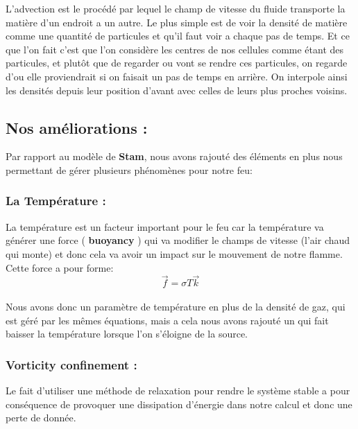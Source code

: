 \documentclass[a4paper,10pt]{article}
\begin{document}
\begin{enumerate}
  L'advection est le procédé par lequel le
    champ de vitesse du fluide transporte la matière d'un endroit a un
    autre. Le plus simple est de voir la densité de matière comme une
    quantité de particules et qu'il faut voir a chaque pas de
    temps. Et ce que l'on fait c'est que l'on considère les centres de
    nos cellules comme étant des particules, et plutôt que de regarder
    ou vont se rendre ces particules, on regarde d'ou elle
    proviendrait si on faisait un pas de temps en arrière. On
    interpole ainsi les densités depuis leur position d'avant avec
    celles de leurs plus proches voisins.\\
\end{enumerate}

\subsection{Nos améliorations :}
Par rapport au modèle de \textbf{Stam}, nous avons rajouté des éléments en plus 
nous permettant de gérer plusieurs phénomènes pour notre feu:\\
 
\subsubsection{La Température :}
La température est un facteur important pour le feu car la température
va générer une force ( \textbf{buoyancy} ) qui va modifier le champs de vitesse 
(l'air chaud qui monte) et donc cela va avoir un impact sur le mouvement de notre
flamme.\\ 
Cette force a pour forme:\\
\begin{equation}
	\vec{f} = \sigma T \vec{k} 
\end{equation}
\\

Nous avons donc un paramètre de température en plus de la densité de gaz, qui
est géré par les mêmes équations, mais a cela nous avons rajouté un
 qui fait baisser la température lorsque
l'on s'éloigne de la source.\\

\subsubsection{Vorticity confinement :}
Le fait d'utiliser une méthode de relaxation pour rendre le système
stable a pour conséquence de provoquer une dissipation d'énergie dans
notre calcul et donc une perte de donnée. \\
\end{document}
